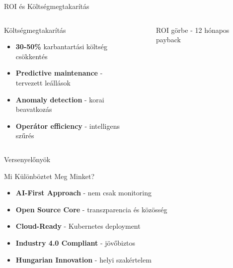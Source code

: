 \documentclass[aspectratio=169,10pt]{beamer}
\newcommand{\highlight}[1]{\textcolor{virtplc-blue}{\textbf{#1}}}
\begin{document}
\begin{frame}{ROI és Költségmegtakarítás}
    \begin{columns}[c]
        \begin{block}{Költségmegtakarítás}
            \begin{itemize}
                \item \highlight{30-50\%} karbantartási költség csökkentés
                \item \highlight{Predictive maintenance} - tervezett leállások
                \item \highlight{Anomaly detection} - korai beavatkozás
                \item \highlight{Operátor efficiency} - intelligens szűrés
            \end{itemize}
        \end{block}
        
        \begin{figure}
            \centering
            \caption{ROI görbe - 12 hónapos payback}
        \end{figure}
    \end{columns}
\end{frame}

\begin{frame}{Versenyelőnyök}
    \begin{alertblock}{Mi Különböztet Meg Minket?}
        \begin{itemize}
            \item \highlight{AI-First Approach} - nem csak monitoring
            \item \highlight{Open Source Core} - transzparencia és közösség
            \item \highlight{Cloud-Ready} - Kubernetes deployment
            \item \highlight{Industry 4.0 Compliant} - jövőbiztos
            \item \highlight{Hungarian Innovation} - helyi szakértelem
        \end{itemize}
    \end{alertblock}
\end{frame}
\end{document}
